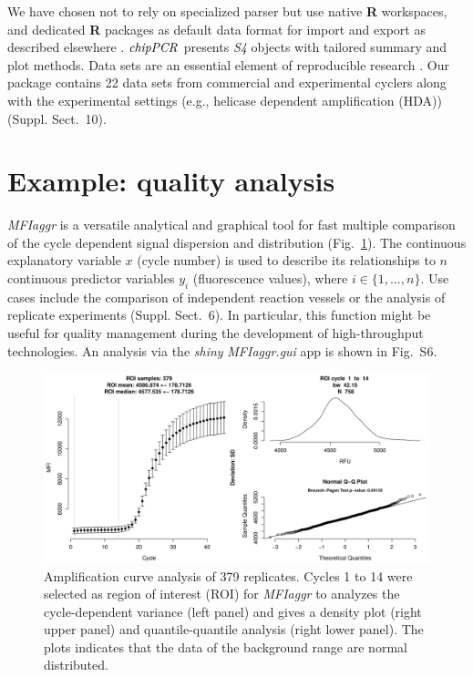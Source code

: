 \documentclass{bioinfo}
\begin{document}
\begin{methods}
We have chosen not to rely on specialized parser but use native \textbf{R} 
workspaces, and dedicated \textbf{R} packages as default data format for import 
and export as described elsewhere \citep{perkins_2012, RCT_2013}. 
$\emph{chipPCR}$ presents \emph{S4} objects with tailored summary and plot 
methods. Data sets are an essential element of reproducible research 
\citep{Leeper_2014}. Our package contains 22 data sets from commercial and 
experimental cyclers along with the experimental settings (e.g., helicase 
dependent amplification (HDA)) (Suppl. Sect.~10). %
\end{methods}

\section{Example: quality analysis}

\textsl{MFIaggr} is a versatile analytical and graphical tool for fast multiple 
comparison of the cycle dependent signal dispersion and distribution 
(Fig.~\ref{fig:01}). The continuous explanatory variable $x$ (cycle number) is used to describe its relationships to $n$ continuous predictor variables $y_i$ (fluorescence values), where $i \in \{1, 
..., n\}$. Use cases include the comparison of independent reaction vessels or 
the analysis of replicate experiments (Suppl. Sect.~6). In %
particular, this function might be useful for quality management during the 
development of high-throughput technologies. An analysis via the \emph{shiny} 
\textsl{MFIaggr.gui} app is shown in Fig.~S6. %

\begin{figure}[!tpb]%
\centerline{\includegraphics{fig01.jpg}}
\caption{Amplification curve analysis of 379 replicates. Cycles 1 to 14 were 
selected as region of interest (ROI) for \textsl{MFIaggr} to analyzes the 
cycle-dependent variance (left panel) and gives a density plot (right upper 
panel) and quantile-quantile analysis (right lower panel). The plots indicates 
that the data of the background range are normal distributed.}\label{fig:01}
\end{figure}
\end{document}
